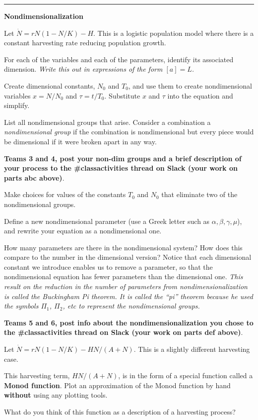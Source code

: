 \documentclass[12pt,letterpaper,noanswers]{exam}
\begin{document}
\vspace{0.2cm}

\hrule
\vspace{0.2cm}
\noindent\textbf{Nondimensionalization}
\begin{questions}
\item Let $\dot{N} = r N (1-N/K) -H$.  This is a logistic population model where there is a constant harvesting rate reducing population growth.

\begin{parts}
\item For each of the variables and each of the parameters, identify its associated dimension.  \emph{Write this out in expressions of the form $[a] = L$.}
\item Create dimensional constants, $N_0$ and $T_0$, and use them to create nondimensional
variables $x = N/N_0$ and $\tau = t/T_0$.  Substitute $x$ and $\tau$ into the equation and simplify.

\item List all nondimensional groups that arise.  Consider a combination a \emph{nondimensional group} if the combination is nondimensional but every piece would be dimensional if it were broken apart in any way.

\textbf{Teams 3 and 4, post your non-dim groups and a brief description of your process to the \#classactivities thread on Slack (your work on parts abc above)}.
\item Make choices for values of the constants $T_0$ and $N_0$ that eliminate two of the nondimensional groups.
\item Define a new nondimensional parameter (use a Greek letter such as $\alpha, \beta, \gamma, \mu$), and rewrite your equation as a nondimensional one.
\item How many parameters are there in the nondimensional system?  
How does this compare to the number in the dimensional version?
 Notice that each dimensional constant we introduce enables us to remove a parameter, so that the nondimensional equation has fewer parameters than the dimensional one.  \emph{This result on the reduction in the number of parameters from nondimensionalization is called the Buckingham Pi theorem.  It is called the ``pi'' theorem because he used the symbols $\Pi_1$, $\Pi_2$, etc to represent the nondimensional groups.}
 
 \textbf{Teams 5 and 6, post info about the nondimensionalization you chose to the \#classactivities thread on Slack (your work on parts def above)}.
\end{parts}
\item Let $\dot{N} = r N (1-N/K) - H N/(A+N)$.  This is a slightly different harvesting case.  
\begin{parts}
\item This harvesting term, $HN/(A+N)$, is in the form of a special function called a \textbf{Monod function}.  Plot an approximation of the Monod function by hand \textbf{without} using any plotting tools.  
\item What do you think of this function as a description of a harvesting process?
 

\end{parts}
\end{questions}
\end{document}
